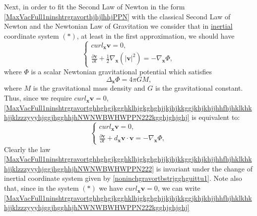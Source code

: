 \documentclass{article}
\theoremstyle{definition}
\theoremstyle{remark}
\renewcommand{\vec}[1]{\mathbf{#1}}
\newcommand{\er}{\eqref}
\newcommand{\er}{\eqref}
\begin{document}
Next, in order to fit the Second Law of Newton in the form
\er{MaxVacFull1ninshtrgravorthjhjlhhjPPN} with the classical Second
Law of Newton and the Newtonian Law of Gravitation we consider that
in \underline{inertial} coordinate system $(*)$, at least in the
first approximation, we should have
\begin{equation}
\label{MaxVacFull1ninshtrgravortghhghgjkgghklhjgkghghjjkjhjkkggjkhjkhjjhhfhjhklkhkhjjklzzzyyyhjggjhgghhjhNWNWBWHWPPN222kgghjghjghj}
\begin{cases}
curl_{\vec x}\vec v= 0,\\
\frac{\partial\vec v}{\partial t}+\frac{1}{2}\nabla_{\vec
x}\left(|\vec v|^2\right)= -\nabla_{\vec x}\Phi,
\end{cases}
\end{equation}
where $\Phi$ is a scalar Newtonian gravitational potential which
satisfies
\begin{equation}
\label{MaxVacFull1ninshtrgravortghhghgjkgghklhjgkghghjjkjhjkkggjkhjkhjjhhfhjhklkhkhjjklzzzyyyhjggjhgghhjhNWNWNWBWHWPPN222}
\Delta_{\vec x}\Phi=4\pi GM,
\end{equation}
where $M$ is the gravitational mass density and $G$ is the
gravitational constant. Thus, since we require $curl_{\vec x}\vec v=
0$,
\er{MaxVacFull1ninshtrgravortghhghgjkgghklhjgkghghjjkjhjkkggjkhjkhjjhhfhjhklkhkhjjklzzzyyyhjggjhgghhjhNWNWBWHWPPN222kgghjghjghj}
is equivalent to:
\begin{equation}
\label{MaxVacFull1ninshtrgravortghhghgjkgghklhjgkghghjjkjhjkkggjkhjkhjjhhfhjhklkhkhjjklzzzyyyhjggjhgghhjhNWNWBWHWPPN222}
\begin{cases}
curl_{\vec x}\vec v= 0,\\
\frac{\partial\vec v}{\partial t}+d_\vec x\vec v\cdot\vec v=
-\nabla_{\vec x}\Phi,
\end{cases}
\end{equation}
Clearly the law
\er{MaxVacFull1ninshtrgravortghhghgjkgghklhjgkghghjjkjhjkkggjkhjkhjjhhfhjhklkhkhjjklzzzyyyhjggjhgghhjhNWNWBWHWPPN222}
is invariant under the change of inertial coordinate system given by
\er{noninchgravortbstrjgghguittu1}. Note also that, since in the
system $(*)$ we have $curl_{\vec x}\vec v=0$, we can write
\er{MaxVacFull1ninshtrgravortghhghgjkgghklhjgkghghjjkjhjkkggjkhjkhjjhhfhjhklkhkhjjklzzzyyyhjggjhgghhjhNWNWBWHWPPN222kgghjghjghj}
\end{document}
